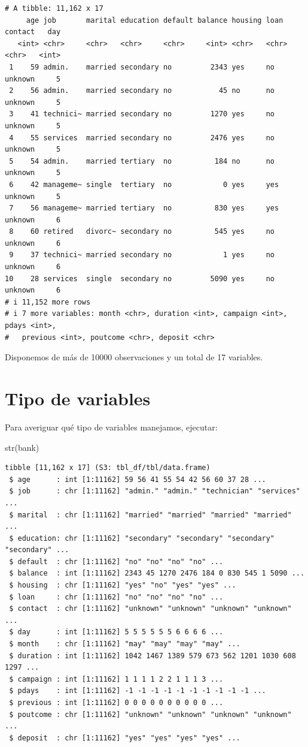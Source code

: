 \documentclass[
  letterpaper,
  DIV=11,
  numbers=noendperiod]{scrreprt}
\newenvironment{Shaded}{\begin{snugshade}}{\end{snugshade}}
\newcommand{\FunctionTok}[1]{\textcolor[rgb]{0.28,0.35,0.67}{#1}}
\newcommand{\NormalTok}[1]{\textcolor[rgb]{0.00,0.23,0.31}{#1}}
\begin{document}
\begin{verbatim}
# A tibble: 11,162 x 17
     age job       marital education default balance housing loan  contact   day
   <int> <chr>     <chr>   <chr>     <chr>     <int> <chr>   <chr> <chr>   <int>
 1    59 admin.    married secondary no         2343 yes     no    unknown     5
 2    56 admin.    married secondary no           45 no      no    unknown     5
 3    41 technici~ married secondary no         1270 yes     no    unknown     5
 4    55 services  married secondary no         2476 yes     no    unknown     5
 5    54 admin.    married tertiary  no          184 no      no    unknown     5
 6    42 manageme~ single  tertiary  no            0 yes     yes   unknown     5
 7    56 manageme~ married tertiary  no          830 yes     yes   unknown     6
 8    60 retired   divorc~ secondary no          545 yes     no    unknown     6
 9    37 technici~ married secondary no            1 yes     no    unknown     6
10    28 services  single  secondary no         5090 yes     no    unknown     6
# i 11,152 more rows
# i 7 more variables: month <chr>, duration <int>, campaign <int>, pdays <int>,
#   previous <int>, poutcome <chr>, deposit <chr>
\end{verbatim}

Disponemos de más de 10000 observaciones y un total de 17 variables.

\hypertarget{tipo-de-variables-1}{%
\section{Tipo de variables}\label{tipo-de-variables-1}}

Para averiguar qué tipo de variables manejamos, ejecutar:

\begin{Shaded}
\begin{Highlighting}[]
\FunctionTok{str}\NormalTok{(bank)}
\end{Highlighting}
\end{Shaded}

\begin{verbatim}
tibble [11,162 x 17] (S3: tbl_df/tbl/data.frame)
 $ age      : int [1:11162] 59 56 41 55 54 42 56 60 37 28 ...
 $ job      : chr [1:11162] "admin." "admin." "technician" "services" ...
 $ marital  : chr [1:11162] "married" "married" "married" "married" ...
 $ education: chr [1:11162] "secondary" "secondary" "secondary" "secondary" ...
 $ default  : chr [1:11162] "no" "no" "no" "no" ...
 $ balance  : int [1:11162] 2343 45 1270 2476 184 0 830 545 1 5090 ...
 $ housing  : chr [1:11162] "yes" "no" "yes" "yes" ...
 $ loan     : chr [1:11162] "no" "no" "no" "no" ...
 $ contact  : chr [1:11162] "unknown" "unknown" "unknown" "unknown" ...
 $ day      : int [1:11162] 5 5 5 5 5 5 6 6 6 6 ...
 $ month    : chr [1:11162] "may" "may" "may" "may" ...
 $ duration : int [1:11162] 1042 1467 1389 579 673 562 1201 1030 608 1297 ...
 $ campaign : int [1:11162] 1 1 1 1 2 2 1 1 1 3 ...
 $ pdays    : int [1:11162] -1 -1 -1 -1 -1 -1 -1 -1 -1 -1 ...
 $ previous : int [1:11162] 0 0 0 0 0 0 0 0 0 0 ...
 $ poutcome : chr [1:11162] "unknown" "unknown" "unknown" "unknown" ...
 $ deposit  : chr [1:11162] "yes" "yes" "yes" "yes" ...
\end{verbatim}
\end{document}
